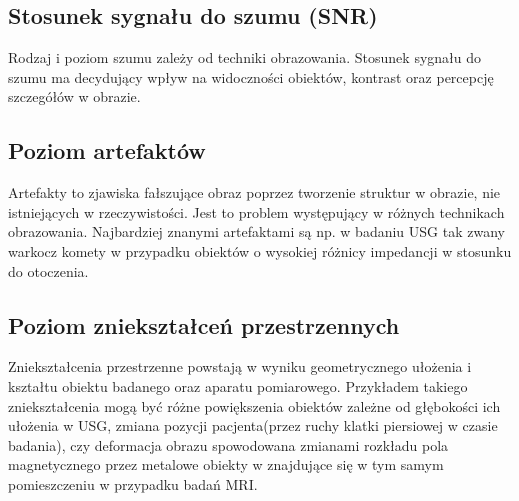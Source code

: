 \subsection{Stosunek sygnału do szumu (SNR)}

Rodzaj i poziom szumu zależy od techniki obrazowania.
Stosunek sygnału do szumu ma decydujący wpływ na widoczności obiektów, kontrast oraz percepcję szczegółów w obrazie.

\subsection{Poziom artefaktów}

Artefakty to zjawiska fałszujące obraz poprzez tworzenie struktur w obrazie, nie istniejących w rzeczywistości.
Jest to problem występujący w różnych technikach obrazowania.
Najbardziej znanymi artefaktami są np. w badaniu USG tak zwany warkocz komety w przypadku obiektów o wysokiej różnicy impedancji w stosunku do otoczenia.

\subsection{Poziom zniekształceń przestrzennych}

Zniekształcenia przestrzenne powstają w wyniku geometrycznego ułożenia i kształtu obiektu badanego oraz aparatu pomiarowego.
Przykładem takiego zniekształcenia mogą być różne powiększenia obiektów zależne od głębokości ich ułożenia w USG, zmiana pozycji pacjenta(przez ruchy klatki piersiowej w czasie badania), czy deformacja obrazu spowodowana zmianami rozkładu pola magnetycznego przez metalowe obiekty w znajdujące się w tym samym pomieszczeniu w przypadku badań MRI.

